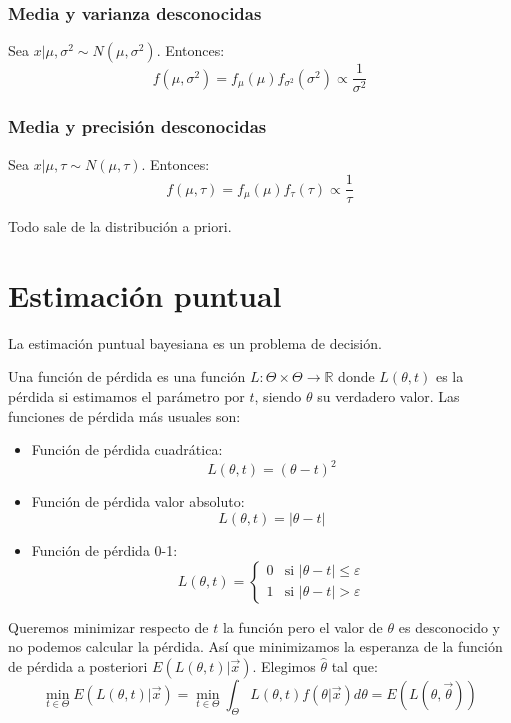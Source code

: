 \subsubsection*{Media y varianza desconocidas}
Sea $x|\mu, \sigma^2 \sim N(\mu, \sigma^2)$.
Entonces:
$$f(\mu, \sigma^2) = f_\mu(\mu)f_{\sigma^2}(\sigma^2) \propto \frac{1}{\sigma^2}$$

\subsubsection*{Media y precisión desconocidas}
Sea $x|\mu, \tau \sim N(\mu, \tau)$.
Entonces:
$$f(\mu, \tau) = f_\mu(\mu)f_\tau(\tau) \propto \frac{1}{\tau}$$

\begin{remark}
    Todo sale de la distribución a priori.
\end{remark}

\section{Estimación puntual}
La estimación puntual bayesiana es un problema de decisión.

Una función de pérdida es una función $L: \Theta \times \Theta \to \mathbb{R}$ donde $L(\theta, t)$ es la pérdida si estimamos el parámetro por $t$, siendo $\theta$ su verdadero valor.
Las funciones de pérdida más usuales son:
\begin{itemize}
    \item Función de pérdida cuadrática:
          $$L(\theta, t) = (\theta-t)^2$$
    \item Función de pérdida valor absoluto:
          $$L(\theta, t) = |\theta-t|$$
    \item Función de pérdida 0-1:
          $$L(\theta, t) = \begin{cases}
                  0 & \text{si } |\theta-t| \leq \varepsilon \\
                  1 & \text{si } |\theta-t| > \varepsilon
              \end{cases}$$
\end{itemize}

Queremos minimizar respecto de $t$ la función pero el valor de $\theta$ es desconocido y no podemos calcular la pérdida.
Así que minimizamos la esperanza de la función de pérdida a posteriori $E(L(\theta, t)|\vec{x})$.
Elegimos $\hat{\theta}$ tal que:
$$\min_{t \in \Theta} E(L(\theta, t)|\vec{x}) = \min_{t \in \Theta} \int_\Theta L(\theta, t)f(\theta|\vec{x})d\theta = E(L(\theta, \vec{\theta}))$$

